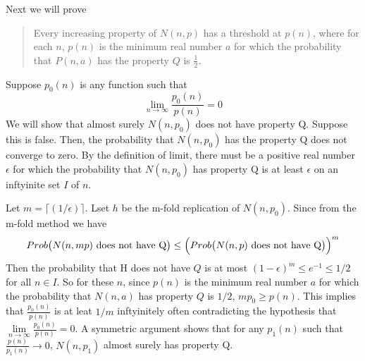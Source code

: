 \documentclass[a4paper, 12pt]{mcshw}
\begin{document}
\begin{enumerate}
\begin{solution}
            Next we will prove
            \begin{quote}
                Every increasing property of $N(n, p)$ has a threshold at $p(n)$, where for each $n$, $p(n)$ is the minimum real number $a$ for which the probability that $P(n, a)$ has the property $Q$ is $\frac{1}{2}$.
            \end{quote}
            Suppose $p_0(n)$ is any function such that
            $$\lim_{n\to\infty}\frac{p_0(n)}{p(n)} = 0$$
            We will show that almost surely $N(n, p_0)$ does not have property Q. Suppose this is false. Then, the probability that $N(n, p_0)$ has the property Q does not converge to zero. By the definition of limit, there must be a positive real number $\epsilon$ for which the probability that $N(n, p_0)$ has property Q is at least $\epsilon$ on an inftyinite set $I$ of $n$. 
            
            Let $m = \lceil (1/\epsilon) \rceil$. Lset $h$ be the m-fold replication of $N(n, p_0)$. Since from the m-fold method we have
            $$Prob\bigl(N(n, mp)\text{ does not have Q}\bigr) \leq {\Bigl(Prob\bigl(N(n, p)\text{ does not have Q}\bigr)\Bigr)}^m$$
            Then the probability that H does not have $Q$ is at most ${(1 - \epsilon)}^m \leq e^{-1} \leq 1/2$ for all $n \in I$. So for these $n$, since $p(n)$ is the minimum real number $a$ for which the probability that $N(n, a)$ has property $Q$ is $1/2$, $mp_0 \geq p(n)$. This implies that $\frac{p_0(n)}{p(n)}$ is at leat $1/m$ inftyinitely often contradicting the hypothesis that $\lim\limits_{n\to\infty}\frac{p_0(n)}{p(n)} = 0$. A symmetric argument shows that for any $p_1(n)$ such that $\frac{p(n)}{p_1(n)}\to 0$, $N(n,p_1)$ almost surely has property Q.
        \end{solution}
\end{enumerate}
\end{document}
